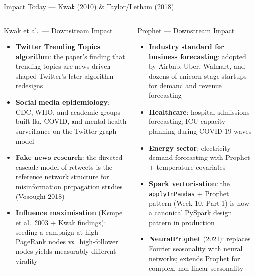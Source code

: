 \documentclass[aspectratio=169,10pt]{beamer}
\begin{document}
\begin{frame}{Impact Today — Kwak (2010) \& Taylor/Letham (2018)}
  \begin{columns}[T]
      \begin{block}{Kwak et al.\ — Downstream Impact}
        \begin{itemize}
          \item \textbf{Twitter Trending Topics algorithm}: the paper's
                finding that trending topics are news-driven shaped
                Twitter's later algorithm redesigns
          \item \textbf{Social media epidemiology}: CDC, WHO, and
                academic groups built flu, COVID, and mental health
                surveillance on the Twitter graph model
          \item \textbf{Fake news research}: the directed-cascade
                model of retweets is the reference network structure
                for misinformation propagation studies (Vosoughi 2018)
          \item \textbf{Influence maximisation} (Kempe et al.\ 2003
                + Kwak findings): seeding a campaign at
                high-PageRank nodes vs.\ high-follower nodes yields
                measurably different virality
        \end{itemize}
      \end{block}

      \begin{block}{Prophet — Downstream Impact}
        \begin{itemize}
          \item \textbf{Industry standard for business forecasting}:
                adopted by Airbnb, Uber, Walmart, and dozens of
                unicorn-stage startups for demand and revenue forecasting
          \item \textbf{Healthcare}: hospital admissions forecasting;
                ICU capacity planning during COVID-19 waves
          \item \textbf{Energy sector}: electricity demand
                forecasting with Prophet + temperature covariates
          \item \textbf{Spark vectorisation}: the \texttt{applyInPandas}
                + Prophet pattern (Week 10, Part 1) is now a
                canonical PySpark design pattern in production
          \item \textbf{NeuralProphet} (2021): replaces Fourier
                seasonality with neural networks; extends Prophet
                for complex, non-linear seasonality
        \end{itemize}
      \end{block}
  \end{columns}
\end{frame}
\end{document}
